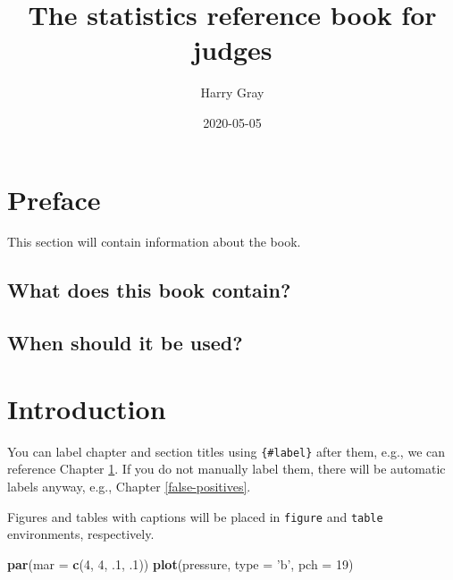 \documentclass[
]{book}
\title{The statistics reference book for judges}
\author{Harry Gray}
\date{2020-05-05}
\newenvironment{Shaded}{\begin{snugshade}}{\end{snugshade}}
\newcommand{\DataTypeTok}[1]{\textcolor[rgb]{0.13,0.29,0.53}{#1}}
\newcommand{\DecValTok}[1]{\textcolor[rgb]{0.00,0.00,0.81}{#1}}
\newcommand{\FloatTok}[1]{\textcolor[rgb]{0.00,0.00,0.81}{#1}}
\newcommand{\KeywordTok}[1]{\textcolor[rgb]{0.13,0.29,0.53}{\textbf{#1}}}
\newcommand{\NormalTok}[1]{#1}
\newcommand{\StringTok}[1]{\textcolor[rgb]{0.31,0.60,0.02}{#1}}
\begin{document}
\maketitle

{
\setcounter{tocdepth}{1}
\tableofcontents
}
\hypertarget{preface}{%
\chapter*{Preface}\label{preface}}

This section will contain information about the book.

\hypertarget{what-does-this-book-contain}{%
\section*{What does this book contain?}\label{what-does-this-book-contain}}

\hypertarget{when-should-it-be-used}{%
\section*{When should it be used?}\label{when-should-it-be-used}}

\hypertarget{intro}{%
\chapter{Introduction}\label{intro}}

You can label chapter and section titles using \texttt{\{\#label\}} after them, e.g., we can reference Chapter \ref{intro}. If you do not manually label them, there will be automatic labels anyway, e.g., Chapter \ref{false-positives}.

Figures and tables with captions will be placed in \texttt{figure} and \texttt{table} environments, respectively.

\begin{Shaded}
\begin{Highlighting}[]
\KeywordTok{par}\NormalTok{(}\DataTypeTok{mar =} \KeywordTok{c}\NormalTok{(}\DecValTok{4}\NormalTok{, }\DecValTok{4}\NormalTok{, }\FloatTok{.1}\NormalTok{, }\FloatTok{.1}\NormalTok{))}
\KeywordTok{plot}\NormalTok{(pressure, }\DataTypeTok{type =} \StringTok{'b'}\NormalTok{, }\DataTypeTok{pch =} \DecValTok{19}\NormalTok{)}
\end{Highlighting}
\end{Shaded}
\end{document}
